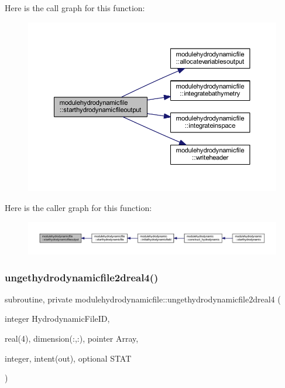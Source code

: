Here is the call graph for this function\+:\nopagebreak
\begin{figure}[H]
\begin{center}
\leavevmode
\includegraphics[width=350pt]{namespacemodulehydrodynamicfile_a782ea415676eeb21e1368c0c2dd1e710_cgraph}
\end{center}
\end{figure}
Here is the caller graph for this function\+:\nopagebreak
\begin{figure}[H]
\begin{center}
\leavevmode
\includegraphics[width=350pt]{namespacemodulehydrodynamicfile_a782ea415676eeb21e1368c0c2dd1e710_icgraph}
\end{center}
\end{figure}
\mbox{\label{namespacemodulehydrodynamicfile_a7f6d7c818b2355e29070b78957b71133}} 
\subsubsection{\texorpdfstring{ungethydrodynamicfile2dreal4()}{ungethydrodynamicfile2dreal4()}}
{\footnotesize\ttfamily subroutine, private modulehydrodynamicfile\+::ungethydrodynamicfile2dreal4 (\begin{DoxyParamCaption}\item[{integer}]{Hydrodynamic\+File\+ID,  }\item[{real(4), dimension(\+:,\+:), pointer}]{Array,  }\item[{integer, intent(out), optional}]{S\+T\+AT }\end{DoxyParamCaption})\hspace{0.3cm}{\ttfamily [private]}}

